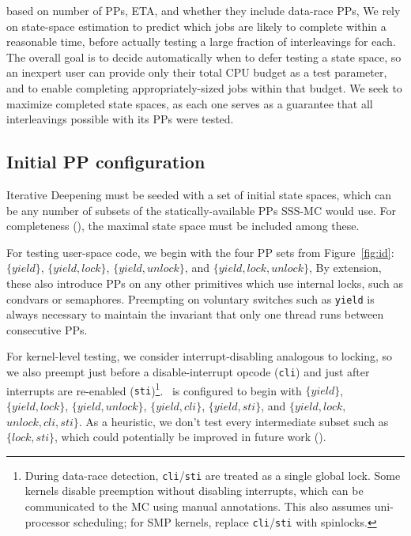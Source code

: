 based on number of PPs, ETA, and whether they include data-race PPs,
We rely on state-space estimation \cite{estimation}
to predict which jobs are likely to complete within a reasonable time,
before actually testing a large fraction of interleavings for each.
The overall goal is to decide automatically when to defer testing a state space,
so an inexpert user can provide only their total CPU budget as a test parameter,
and to enable completing appropriately-sized jobs within that budget.
We seek to maximize completed state spaces,
as each one serves as a guarantee that all interleavings possible with its PPs were tested.


\subsection{Initial PP configuration}
\label{sec:initial-pp}

Iterative Deepening must be seeded with a set of initial state spaces,
which can be any number of subsets of the statically-available PPs SSS-MC would use.
For completeness (\sect{\ref{sec:totalverif}}), the maximal state space must be included among these.

For testing user-space code, we begin with the four PP sets from Figure~\ref{fig:id}:
$\{yield\}$,
$\{yield,lock\}$,
$\{yield,unlock\}$,
and $\{yield,lock,unlock\}$,
By extension, these also introduce PPs on any other primitives
which use
internal locks,
such as condvars or semaphores.
Preempting on voluntary switches such as {\tt yield} is always necessary to maintain the invariant that only one thread runs between consecutive PPs.

For kernel-level testing, we consider interrupt-disabling analogous to locking,
so we also preempt just before a disable-interrupt opcode ({\tt cli}) and just after interrupts are re-enabled ({\tt sti})\footnote{
During data-race detection, {\tt cli}/{\tt sti} are treated as a single global lock.
Some kernels disable preemption without disabling interrupts,
which can be communicated to the MC using manual annotations. %
This also assumes uni-processor scheduling; for SMP kernels, replace {\tt cli}/{\tt sti} with spinlocks.}.
\quicksand~is configured to begin with
$\{yield\}$,
$\{yield,lock\}$,
$\{yield,unlock\}$,
$\{yield,cli\}$,
$\{yield,sti\}$,
and $\{yield,lock,$ $unlock,cli,sti\}$.
As a heuristic, we don't test every intermediate subset such as $\{lock,sti\}$,
which could potentially be improved in future work (\sect{\ref{sec:future}}).

